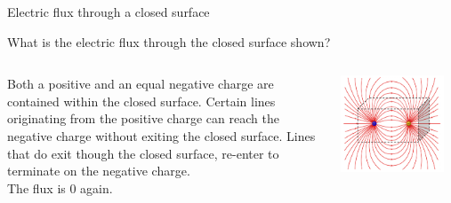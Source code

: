 %
%
%

\begin{frame}{Electric flux through a closed surface}

\begin{center}
 What is the electric flux through the closed surface shown?\\
\end{center}
\vspace{0.2cm}

\begin{columns}
  \begin{column}{0.38\textwidth}
   {\small
     Both a positive and an equal negative charge are contained within the closed surface.
     Certain lines originating from the positive charge can reach the negative charge without exiting the closed surface.
     Lines that do exit though the closed surface, re-enter to terminate on the negative charge. \\
     \vspace{0.2cm}
     The flux is 0 again.
   }
   \begin{center}
   \end{center}
  \end{column}
  \begin{column}{0.62\textwidth}
    \includegraphics[width=0.90\textwidth]{./images/schematics/electric_dipole_field_lines_closed_surf_bothq.png}\\
  \end{column}
\end{columns}
\end{frame}


